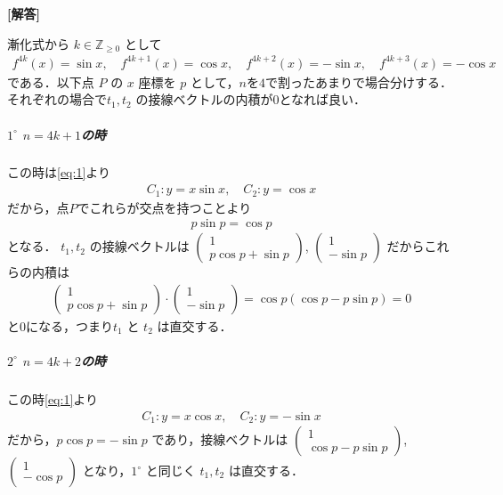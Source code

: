 \documentclass[../../main.tex]{subfiles}
\begin{document}
\begin{oframed}
  
\end{oframed}

{\bf [解答]}

漸化式から $k \in \mathbb{Z}_{\ge 0}$ として
\begin{align}
  f^{4k}(x)   = \sin x, \quad
  f^{4k+1}(x) = \cos x, \quad
  f^{4k+2}(x) = -\sin x, \quad
  f^{4k+3}(x) = -\cos x \label{eq:1}
\end{align}
である．以下点 $P$ の $x$ 座標を $p$ として，$n$を$4$で割ったあまりで場合分けする．
それぞれの場合で$t_1, t_2$ の接線ベクトルの内積が$0$となれば良い．

\subparagraph{$1^\circ$ $n=4k+1$の時}

この時は\cref{eq:1}より
\begin{align}
  C_1 : y = x\sin x, \quad
  C_2 : y = \cos x
\end{align}
だから，点$P$でこれらが交点を持つことより
\begin{align}
  p \sin p = \cos p \label{eq:2}
\end{align}
となる．
$t_1, t_2$ の接線ベクトルは $
\begin{pmatrix} 1 \\ p \cos p + \sin p
\end{pmatrix}$, $
\begin{pmatrix} 1 \\ -\sin p
\end{pmatrix}$
だからこれらの内積は
\begin{align}
  \begin{pmatrix} 1 \\ p \cos p + \sin p
  \end{pmatrix} \cdot
  \begin{pmatrix} 1 \\ -\sin p
  \end{pmatrix} = \cos p (\cos p - p \sin p) = 0
\end{align}
と$0$になる，つまり$t_1$ と $t_2$ は直交する．

\subparagraph{$2^\circ$ $n=4k+2$の時}

この時\cref{eq:1}より
\begin{align}
  C_1 : y = x\cos x, \quad
  C_2 : y = -\sin x
\end{align}
だから，$p \cos p = -\sin p$ であり，接線ベクトルは
$
\begin{pmatrix} 1 \\ \cos p - p \sin p
\end{pmatrix}$, $
\begin{pmatrix} 1 \\ -\cos p
\end{pmatrix}$
となり，$1^\circ$ と同じく $t_1, t_2$ は直交する．
\end{document}
